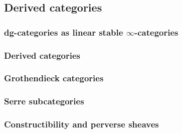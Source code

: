     \subsection{Derived categories}
        \subsubsection{dg-categories as linear stable \texorpdfstring{$\infty$}{}-categories}
        
        \subsubsection{Derived categories}
        
        \subsubsection{Grothendieck categories}
        
        \subsubsection{Serre subcategories}
    
        \subsubsection{Constructibility and perverse sheaves}